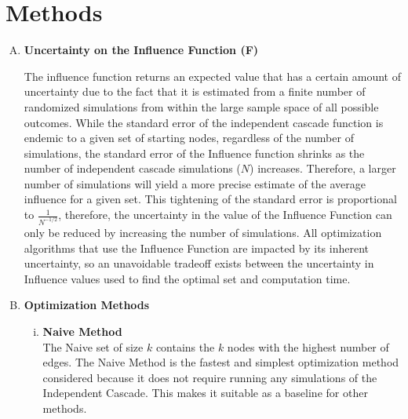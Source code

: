 \documentclass[11pt]{scrartcl} %
\begin{document}
\section{Methods}

\begin{enumerate}[A)]

\item \textbf {Uncertainty on the Influence Function (F)}\\
\par
The influence function returns an expected value that has a certain amount of uncertainty due to the fact that it is estimated from a finite number of randomized simulations from within the large sample space of all possible outcomes.  While the standard error of the independent cascade function is endemic to a given set of starting nodes, regardless of the number of simulations, the standard error of the Influence function shrinks as the number of independent cascade simulations ($N$) increases.  Therefore, a larger number of simulations will yield a more precise estimate of the average influence for a given set.  This tightening of the standard error is proportional to $\frac{1}{N^{-1/2}}$, therefore, the uncertainty in the value of the Influence Function can only be reduced by increasing the number of simulations.  All optimization algorithms that use the Influence Function are impacted by its inherent uncertainty, so an unavoidable tradeoff exists between the uncertainty in Influence values used to find the optimal set and computation time. \\

\item \textbf {Optimization Methods} \\
\par

\begin{enumerate}[i.]
\item \textbf{Naive Method}\\
The Naive set of size $k$ contains the $k$ nodes with the highest number of edges.  The Naive Method is the fastest and simplest optimization method considered because it does not require running any simulations of the Independent Cascade.  This makes it suitable as a baseline for other methods.  
\\


\end{enumerate}
\end{enumerate}
\end{document}
